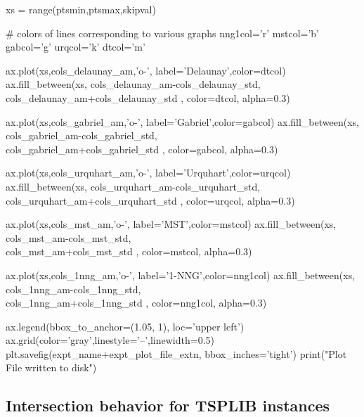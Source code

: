      xs = range(ptsmin,ptsmax,skipval)

     # colors of lines corresponding to various graphs
     nng1col='r'
     mstcol='b'
     gabcol='g'
     urqcol='k'
     dtcol='m'
 
     ax.plot(xs,cols_delaunay_am,'o-', label='Delaunay',color=dtcol)
     ax.fill_between(xs, cols_delaunay_am-cols_delaunay_std, \\
                         cols_delaunay_am+cols_delaunay_std ,  color=dtcol, alpha=0.3)     
  
     ax.plot(xs,cols_gabriel_am,'o-', label='Gabriel',color=gabcol)
     ax.fill_between(xs, cols_gabriel_am-cols_gabriel_std, \\
                         cols_gabriel_am+cols_gabriel_std ,  color=gabcol, alpha=0.3)     

     ax.plot(xs,cols_urquhart_am,'o-', label='Urquhart',color=urqcol)
     ax.fill_between(xs, cols_urquhart_am-cols_urquhart_std, \\
                         cols_urquhart_am+cols_urquhart_std ,  color=urqcol, alpha=0.3)     


     ax.plot(xs,cols_mst_am,'o-', label='MST',color=mstcol)
     ax.fill_between(xs, cols_mst_am-cols_mst_std, \\
                         cols_mst_am+cols_mst_std ,  color=mstcol, alpha=0.3)     

     ax.plot(xs,cols_1nng_am,'o-', label='1-NNG',color=nng1col)
     ax.fill_between(xs, cols_1nng_am-cols_1nng_std, \\
                         cols_1nng_am+cols_1nng_std ,  color=nng1col, alpha=0.3)     

     ax.legend(bbox_to_anchor=(1.05, 1), loc='upper left')
     ax.grid(color='gray',linestyle='--',linewidth=0.5)
     plt.savefig(expt_name+expt_plot_file_extn, bbox_inches='tight')
     print("Plot File written to disk")
\nwendcode{}\nwdocspar
     
\subsection{Intersection behavior for TSPLIB instances}

\nwenddocs{}

